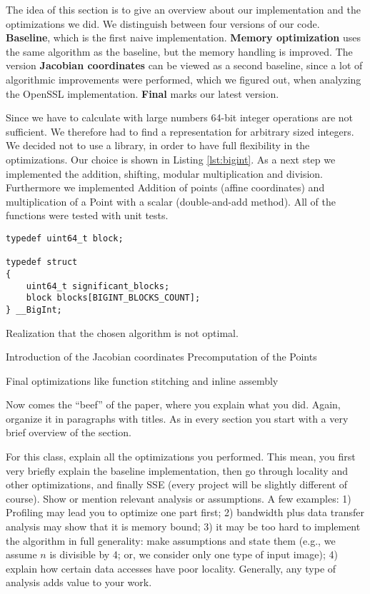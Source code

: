 The idea of this section is to give an overview about our implementation and the optimizations we did. We distinguish between four versions of our code. \textbf{Baseline}, which is the first naive implementation. \textbf{Memory optimization} uses the same algorithm as the baseline, but the memory handling is improved. The version \textbf{Jacobian coordinates} can be viewed as a second baseline, since a lot of algorithmic improvements were performed, which we figured out, when analyzing the OpenSSL implementation. \textbf{Final} marks our latest version.

Since we have to calculate with large numbers 64-bit integer operations are not sufficient. We therefore had to find a representation for arbitrary sized integers. We decided not to use a library, in order to have full flexibility in the optimizations. Our choice is shown in Listing \ref{lst:bigint}. As a next step we implemented the addition, shifting, modular multiplication and division. Furthermore we implemented Addition of points (affine coordinates) and multiplication of a Point with a scalar (double-and-add method). All of the functions were tested with unit tests.

\begin{lstlisting}[frame=single,  captionpos=b, caption=representation of the arbitrary size integers, label=lst:bigint]
typedef uint64_t block;

typedef struct 
{
    uint64_t significant_blocks;    
    block blocks[BIGINT_BLOCKS_COUNT]; 
} __BigInt;
\end{lstlisting}


Realization that the chosen algorithm is not optimal.

Introduction of the Jacobian coordinates
Precomputation of the Points

Final optimizations like function stitching and inline assembly 

Now comes the ``beef'' of the paper, where you explain what you
did. Again, organize it in paragraphs with titles. As in every section
you start with a very brief overview of the section.

For this class, explain all the optimizations you performed. This mean, you first very briefly
explain the baseline implementation, then go through locality and other optimizations, and finally SSE (every project will be slightly different of course). Show or mention relevant analysis or assumptions. A few examples: 1) Profiling may lead you to optimize one part first; 2) bandwidth plus data transfer analysis may show that it is memory bound; 3) it may be too hard to implement the algorithm in full generality: make assumptions and state them (e.g., we assume $n$ is divisible by 4; or, we consider only one type of input image); 4) explain how certain data accesses have poor locality. Generally, any type of analysis adds value to your work.

